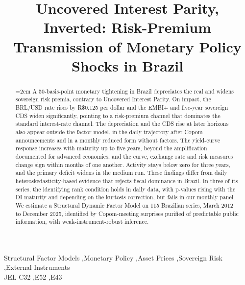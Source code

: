 \documentclass[preprint,authoryear,review,12pt]{elsarticle}
\begin{document}
\begin{frontmatter}
\title{Uncovered Interest Parity, Inverted: Risk-Premium Transmission of Monetary Policy Shocks in Brazil}




\begin{abstract}
\singlespacing\emergencystretch=2em
\noindent A 50-basis-point monetary tightening in Brazil depreciates the real and widens sovereign risk premia, contrary to Uncovered Interest Parity. On impact, the BRL/USD rate rises by R\$0.125 per dollar and the EMBI+ and five-year sovereign CDS widen significantly, pointing to a risk-premium channel that dominates the standard interest-rate channel. The depreciation and the CDS rise at later horizons also appear outside the factor model, in the daily trajectory after Copom announcements and in a monthly reduced form without factors. The yield-curve response increases with maturity up to five years, beyond the amplification documented for advanced economies, and the curve, exchange rate and risk measures change sign within months of one another. Activity stays below zero for three years, and the primary deficit widens in the medium run. These findings differ from daily heteroskedasticity-based evidence that rejects fiscal dominance in Brazil. In three of its series, the identifying rank condition holds in daily data, with p-values rising with the DI maturity and depending on the kurtosis correction, but fails in our monthly panel. We estimate a Structural Dynamic Factor Model on 115 Brazilian series, March 2012 to December 2025, identified by Copom-meeting surprises purified of predictable public information, with weak-instrument-robust inference.
\end{abstract}



\begin{keyword}
Structural Factor Models  \sep Monetary Policy  \sep Asset Prices \sep Sovereign Risk \sep External Instruments
\\[0.1in]
JEL C32 \sep E52 \sep E43 \\[0.1in]
\end{keyword}


\end{frontmatter}
\onehalfspacing   
%
\end{document}
